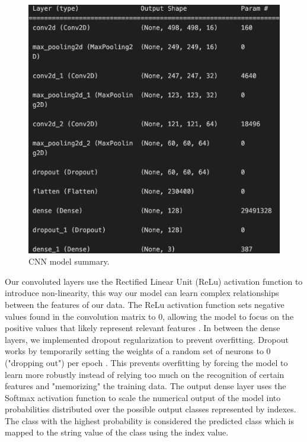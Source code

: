 \begin{figure}[h]
	\centering
	\includegraphics[scale=0.5]{CNN_structure}
	\caption{CNN model summary.}
	\label{fig:figure3}
\end{figure}

Our convoluted layers use the Rectified Linear Unit (ReLu) activation function to introduce non-linearity, this way our model can learn complex relationships between the features of our data. 
The ReLu activation function sets negative values found in the convolution matrix to 0, allowing the model to focus on the positive values that likely represent relevant features \cite{ReLu}. 
In between the dense layers, we implemented dropout regularization to prevent overfitting. 
Dropout works by temporarily setting the weights of a random set of neurons to 0 ("dropping out") per epoch \cite{Dropout}.
This prevents overfitting by forcing the model to learn more robustly instead of relying too much on the recognition of certain features and "memorizing" the training data. 
The output dense layer uses the Softmax activation function to scale the numerical output of the model into probabilities distributed over the possible output classes represented by indexes. 
The class with the highest probability is considered the predicted class which is mapped to the string value of the class using the index value.

